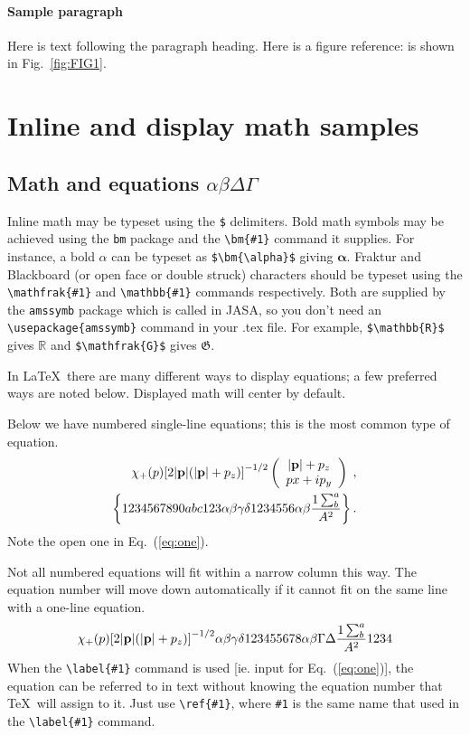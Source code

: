 \paragraph{Sample paragraph}Here is text following the paragraph
heading.
Here is a figure reference: is shown in Fig.~\ref{fig:FIG1}.

\section{Inline and display math samples\label{sec:3}}

\subsection{\label{subsec:3:3} Math and equations $\alpha\beta\Delta\Gamma$}
Inline math may be typeset using the \verb+$+ delimiters. Bold math
symbols may be achieved using the \verb+bm+ package and the
\verb+\bm{#1}+ command it supplies. For instance, a bold $\alpha$ can
be typeset as \verb+$\bm{\alpha}$+ giving $\bm{\alpha}$. Fraktur and
Blackboard (or open face or double struck) characters should be
typeset using the \verb+\mathfrak{#1}+ and \verb+\mathbb{#1}+ commands
respectively. Both are supplied by the \texttt{amssymb} package which
is called in JASA, so you don't need an \verb+\usepackage{amssymb}+
command in your .tex file. For
example, \verb+$\mathbb{R}$+ gives $\mathbb{R}$ and
\verb+$\mathfrak{G}$+ gives $\mathfrak{G}$.

In \LaTeX\ there are many different ways to display equations; a
few preferred ways are noted below. Displayed math will center by
default.

Below we have numbered single-line equations; this is the most common
type of equation.
\begin{eqnarray}
\chi_+(p){\bf [}2|{\bf p}|(|{\bf p}|+p_z){\bf ]}^{-1/2}
\left(
\begin{array}{c}
|{\bf p}|+p_z\\
px+ip_y
\end{array}\right)\;,
\\
\left\{%
 1234567890abc123\alpha\beta\gamma\delta1234556\alpha\beta
 \frac{1\sum^{a}_{b}}{A^2}%
\right\}%
\label{eq:one}.
\end{eqnarray}
Note the open one in Eq.~(\ref{eq:one}).

Not all numbered equations will fit within a narrow column this
way. The equation number will move down automatically if it cannot fit
on the same line with a one-line equation.
\begin{equation}
\chi_+(p){\bf [}2|{\bf p}|(|{\bf p}|+p_z){\bf ]}^{-1/2}
\alpha\beta\gamma\delta123455678\alpha\beta\Gamma\Delta
 \frac{1\sum^{a}_{b}}{A^2}1234%
\end{equation}
When the \verb+\label{#1}+ command is used [ie. input for
Eq.~(\ref{eq:one})], the equation can be referred to in text without
knowing the equation number that \TeX\ will assign to it. Just
use \verb+\ref{#1}+, where \verb+#1+ is the same name that used in
the \verb+\label{#1}+ command.

